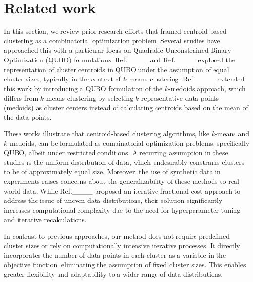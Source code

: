 \section{Related work}
\label{sec:related}

In this section, we review prior research efforts that framed centroid-based clustering as a combinatorial optimization problem. Several studies have approached this with a particular focus on Quadratic Unconstrained Binary Optimization (QUBO) formulations.
Ref.____ and Ref.____ explored the representation of cluster centroids in QUBO under the assumption of equal cluster sizes, typically in the context of $k$-means clustering. Ref.____ extended this work by introducing a QUBO formulation of the $k$-medoids approach, which differs from $k$-means clustering by selecting $k$ representative data points (medoids) as cluster centers instead of calculating centroids based on the mean of the data points.

These works illustrate that centroid-based clustering algorithms, like $k$-means and $k$-medoids, can be formulated as combinatorial optimization problems, specifically QUBO, albeit under restricted conditions. A recurring assumption in these studies is the uniform distribution of data, which undesirably constrains clusters to be of approximately equal size. Moreover, the use of synthetic data in experiments raises concerns about the generalizability of these methods to real-world data. While Ref.____ proposed an iterative fractional cost approach to address the issue of uneven data distributions, their solution significantly increases computational complexity due to the need for hyperparameter tuning and iterative recalculations.

In contrast to previous approaches, our method does not require predefined cluster sizes or rely on computationally intensive iterative processes. It directly incorporates the number of data points in each cluster as a variable in the objective function, eliminating the assumption of fixed cluster sizes. This enables greater flexibility and adaptability to a wider range of data distributions.